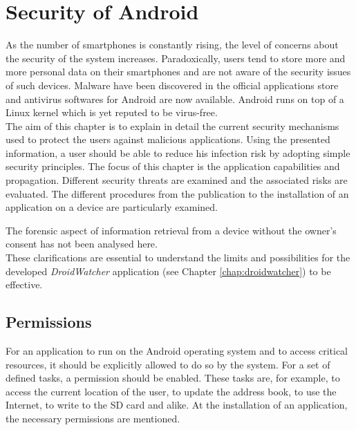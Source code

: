 \chapter{Security of Android}
\label{chap:and-secu}

As the number of smartphones is constantly rising, the level of concerns about the security of the system increases.
Paradoxically, users tend to store more and more personal data on their smartphones and are not aware of the security issues of such devices.
Malware have been discovered in the official applications store and antivirus softwares for Android are now available.
Android runs on top of a Linux kernel which is yet reputed to be virus-free.\\

The aim of this chapter is to explain in detail the current security mechanisms used to protect the users against malicious applications.
Using the presented information, a user should be able to reduce his infection risk by adopting simple security principles.
The focus of this chapter is the application capabilities and propagation.
Different security threats are examined and the associated risks are evaluated.
The different procedures from the publication to the installation of an application on a device are particularly examined.

The forensic aspect of information retrieval from a device without the owner's consent has not been analysed here.\\

These clarifications are essential to understand the limits and possibilities for the developed \emph{DroidWatcher} application (see Chapter \ref{chap:droidwatcher}) to be effective.

\section{Permissions}
\label{sec:permissions}

For an application to run on the Android operating system and to access critical resources, it should be explicitly allowed to do so by the system. %
For a set of defined tasks, a permission should be enabled.
These tasks are, for example, to access the current location of the user, to update the address book, to use the Internet, to write to the SD card and alike.
At the installation of an application, the necessary permissions are mentioned.\\

